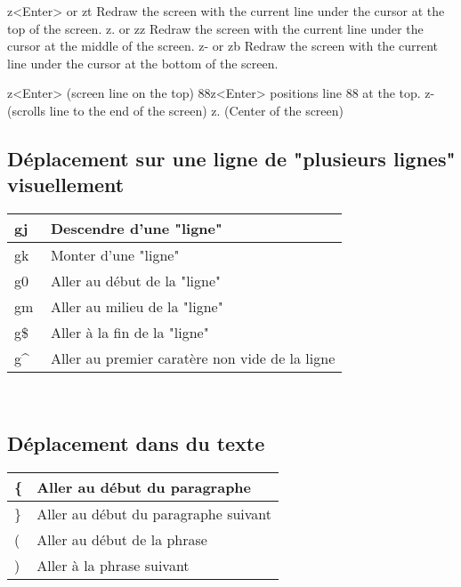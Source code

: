 \documentclass{article}
\begin{document}
z<Enter> or zt Redraw the screen with the current line under the cursor at the top of the screen.
z.  or zz Redraw the screen with the current line under the cursor at the middle of the screen.
z- or zb Redraw the screen with the current line under the cursor at the bottom of the screen.

z<Enter> (screen line on the top)
88z<Enter> positions line 88 at the top.
z- (scrolls line to the end of the screen)
z. (Center of the screen)

\subsection{Déplacement sur une ligne de "plusieurs lignes" visuellement }
\begin{tabular}{|p{3cm}| l| }
\hline
gj & Descendre d'une "ligne"\\ \hline
gk & Monter d'une "ligne"\\ \hline
g0 & Aller au début de la "ligne"\\ \hline
gm & Aller au milieu de la "ligne"\\ \hline
g\$ & Aller à la fin de la "ligne"\\ \hline
g\^~ & Aller au premier caratère non vide de la ligne\\ \hline
\end{tabular}\\

\subsection{Déplacement dans du texte}
\begin{tabular}{|p{3cm}| l| }\hline
\{ & Aller au début du paragraphe \\ \hline
\} & Aller au début du paragraphe suivant \\ \hline
( & Aller au début de la phrase \\ \hline
) & Aller à la phrase suivant \\ \hline
\end{tabular}\\
\end{document}
